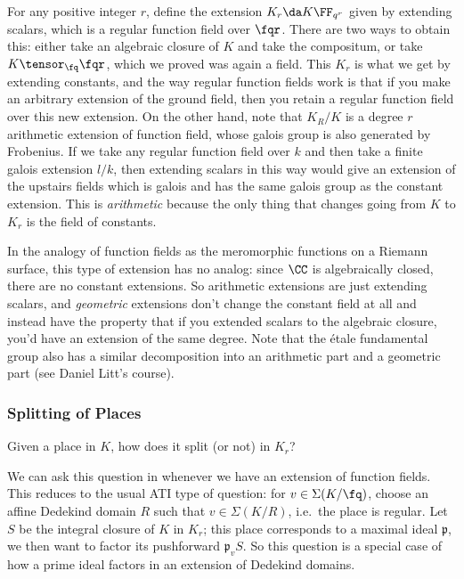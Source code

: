 For any positive integer \(r\), define the extension
\(K_r \da K \FF_{q^r}\) given by extending scalars, which is a regular
function field over \(\fqr\). There are two ways to obtain this: either
take an algebraic closure of \(K\) and take the compositum, or take
\(K\tensor_{\fq}\fqr\), which we proved was again a field. This \(K_r\)
is what we get by extending constants, and the way regular function
fields work is that if you make an arbitrary extension of the ground
field, then you retain a regular function field over this new extension.
On the other hand, note that \(K_R/K\) is a degree \(r\) arithmetic
extension of function field, whose galois group is also generated by
Frobenius. If we take any regular function field over \(k\) and then
take a finite galois extension \(l/k\), then extending scalars in this
way would give an extension of the upstairs fields which is galois and
has the same galois group as the constant extension. This is
\emph{arithmetic} because the only thing that changes going from \(K\)
to \(K_r\) is the field of constants.

In the analogy of function fields as the meromorphic functions on a
Riemann surface, this type of extension has no analog: since \(\CC\) is
algebraically closed, there are no constant extensions. So arithmetic
extensions are just extending scalars, and \emph{geometric} extensions
don't change the constant field at all and instead have the property
that if you extended scalars to the algebraic closure, you'd have an
extension of the same degree. Note that the étale fundamental group also
has a similar decomposition into an arithmetic part and a geometric part
(see Daniel Litt's course).

\hypertarget{splitting-of-places}{%
\subsubsection{Splitting of Places}\label{splitting-of-places}}

\begin{question}

Given a place in \(K\), how does it split (or not) in \(K_r\)?

\end{question}

\begin{remark}

We can ask this question in whenever we have an extension of function
fields. This reduces to the usual ATI type of question: for
\(v\in \Sigma(K/\fq)\), choose an affine Dedekind domain \(R\) such that
\(v\in \Sigma(K/R)\), i.e.~the place is regular. Let \(S\) be the
integral closure of \(K\) in \(K_r\); this place corresponds to a
maximal ideal \(\mathfrak{p}\), we then want to factor its pushforward
\(\mathfrak{p}_v S\). So this question is a special case of how a prime
ideal factors in an extension of Dedekind domains.

\end{remark}

